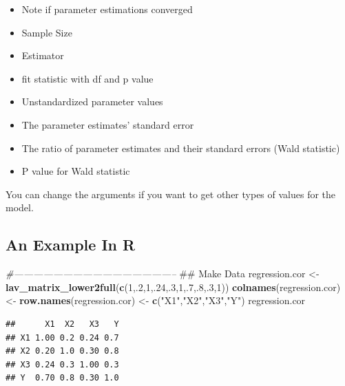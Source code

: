 \documentclass[]{book}
\newenvironment{Shaded}{\begin{snugshade}}{\end{snugshade}}
\newcommand{\KeywordTok}[1]{\textcolor[rgb]{0.13,0.29,0.53}{\textbf{#1}}}
\newcommand{\DecValTok}[1]{\textcolor[rgb]{0.00,0.00,0.81}{#1}}
\newcommand{\StringTok}[1]{\textcolor[rgb]{0.31,0.60,0.02}{#1}}
\newcommand{\CommentTok}[1]{\textcolor[rgb]{0.56,0.35,0.01}{\textit{#1}}}
\newcommand{\NormalTok}[1]{#1}
\providecommand{\tightlist}{%
  \setlength{\itemsep}{0pt}\setlength{\parskip}{0pt}}
\theoremstyle{definition}
\theoremstyle{definition}
\theoremstyle{definition}
\theoremstyle{remark}
\begin{document}
\begin{itemize}
\tightlist
\item
  Note if parameter estimations converged
\item
  Sample Size
\item
  Estimator
\item
  fit statistic with df and p value
\item
  Unstandardized parameter values
\item
  The parameter estimates' standard error
\item
  The ratio of parameter estimates and their standard errors (Wald
  statistic)
\item
  P value for Wald statistic
\end{itemize}

You can change the arguments if you want to get other types of values
for the model.

\subsection{An Example In R}\label{an-example-in-r}

\begin{Shaded}
\begin{Highlighting}[]
\CommentTok{#--------------------------------------------------}
\NormalTok{## Make Data}
\NormalTok{regression.cor <-}\StringTok{ }\KeywordTok{lav_matrix_lower2full}\NormalTok{(}\KeywordTok{c}\NormalTok{(}\DecValTok{1}\NormalTok{,.}\DecValTok{2}\NormalTok{,}\DecValTok{1}\NormalTok{,.}\DecValTok{24}\NormalTok{,.}\DecValTok{3}\NormalTok{,}\DecValTok{1}\NormalTok{,.}\DecValTok{7}\NormalTok{,.}\DecValTok{8}\NormalTok{,.}\DecValTok{3}\NormalTok{,}\DecValTok{1}\NormalTok{))}
\KeywordTok{colnames}\NormalTok{(regression.cor) <-}\StringTok{ }\KeywordTok{row.names}\NormalTok{(regression.cor) <-}\StringTok{ }\KeywordTok{c}\NormalTok{(}\StringTok{"X1"}\NormalTok{,}\StringTok{"X2"}\NormalTok{,}\StringTok{"X3"}\NormalTok{,}\StringTok{"Y"}\NormalTok{)}
\NormalTok{regression.cor}
\end{Highlighting}
\end{Shaded}

\begin{verbatim}
##      X1  X2   X3   Y
## X1 1.00 0.2 0.24 0.7
## X2 0.20 1.0 0.30 0.8
## X3 0.24 0.3 1.00 0.3
## Y  0.70 0.8 0.30 1.0
\end{verbatim}
\end{document}

